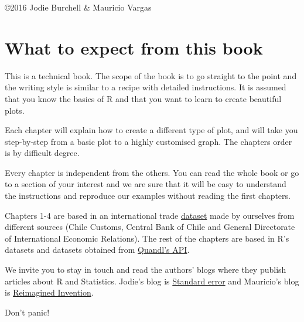 \documentclass[11pt, oneside]{report}
\begin{document}
\copyright 2016 Jodie Burchell \& Mauricio Vargas

\newpage
\tableofcontents
\newpage

%
%

\setcounter{page}{1}

\chapter*{What to expect from this book}

This is a technical book. The scope of the book is to go straight to the point and the writing style is similar to a recipe with detailed instructions. It is assumed that you know the basics of R and that you want to learn to create beautiful plots. 

Each chapter will explain how to create a different type of plot, and will take you step-by-step from a basic plot to a highly customised graph. The chapters order is by difficult degree.

Every chapter is independent from the others. You can read the whole book or go to a section of your interest and we are sure that it will be easy to understand the instructions and reproduce our examples without reading the first chapters.

Chapters 1-4 are based in an international trade
\href{http://pachamaltese.github.io/stats/trade-chile-china/copper-data-for-chapter.csv}{dataset}
made by ourselves from different sources (Chile Customs, Central Bank of
Chile and General Directorate of International Economic Relations). The rest of the chapters are based in R's datasets and datasets obtained from \href{https://www.quandl.com/}{Quandl's API}.

We invite you to stay in touch and read the authors' blogs where they publish articles about R and Statistics. Jodie's blog is \href{http://t-redactyl.io/}{Standard error} and Mauricio's blog is \href{http://pachamaltese.github.io/}{Reimagined Invention}.

\bigskip
\bigskip
\bigskip

\begin{center}
Don't panic!
\end{center}

\end{document}
